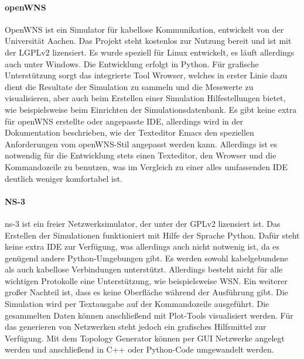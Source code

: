 \paragraph{openWNS\cite{openwns}}

OpenWNS ist ein Simulator für kabellose Kommunikation, entwickelt von der Universität Aachen. Das Projekt steht kostenlos zur Nutzung bereit und ist mit der LGPLv2 lizensiert. \newline
Es wurde speziell für Linux entwickelt, es läuft allerdings auch unter Windows. Die Entwicklung erfolgt in Python. Für grafische Unterstützung sorgt das integrierte Tool Wrowser\cite{wrowser}, welches in erster Linie dazu dient die Resultate der Simulation zu sammeln und die Messwerte zu visualisieren, aber auch beim Erstellen einer Simulation Hilfestellungen bietet, wie beispielsweise beim Einrichten der Simulationsdatenbank.\newline
Es gibt keine extra für openWNS erstellte oder angepasste IDE, allerdings wird in der Dokumentation beschrieben, wie der Texteditor Emacs\cite{emacs} den speziellen Anforderungen vom openWNS-Stil angepasst werden kann. Allerdings ist es notwendig für die Entwicklung stets einen Texteditor, den Wrowser und die Kommandozeile zu benutzen, was im Vergleich zu einer alles umfassenden IDE deutlich weniger komfortabel ist.

\paragraph{NS-3\cite{ns3}}

ns-3 ist ein freier Netzwerksimulator, der unter der GPLv2 lizensiert ist. Das Erstellen der Simulationen funktioniert mit Hilfe der Sprache Python. Dafür steht keine extra IDE zur Verfügung, was allerdings auch nicht notwenig ist, da es genügend andere Python-Umgebungen gibt.\newline
Es werden sowohl kabelgebundene als auch kabellose Verbindungen unterstützt. Allerdings besteht nicht für alle wichtigen Protokolle eine Unterstützung, wie beispielsweise WSN.\newline
Ein weiterer großer Nachteil ist, dass es keine Oberfläche während der Ausführung gibt. Die Simulation wird per Textausgabe auf der Kommandozeile ausgeführt. Die gesammelten Daten können anschließend mit Plot-Tools visualisiert werden. Für das generieren von Netzwerken steht jedoch ein grafisches Hilfsmittel zur Verfügung. Mit dem Topology Generator\cite{TopGen} können per GUI Netzwerke angelegt werden und anschließend in C++ oder Python-Code umgewandelt werden. 

